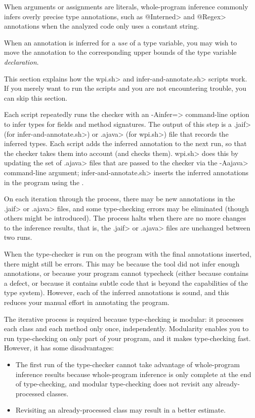 When arguments or assignments are literals, whole-program inference
commonly infers overly precise type annotations, such as \<@Interned> and
\<@Regex> annotations when the analyzed code only uses a constant string.

When an annotation is inferred for a \emph{use} of a type variable,
you may wish to move the annotation
to the corresponding upper bounds of the type variable \emph{declaration}.



This section explains how the \<wpi.sh> and \<infer-and-annotate.sh> scripts work.  If you
merely want to run the scripts and you are not encountering trouble, you can
skip this section.

Each script repeatedly runs the checker with an \<-Ainfer=> command-line option to infer
types for fields and method signatures.  The output of this step
is a \<.jaif> (for \<infer-and-annotate.sh>) or \<.ajava> (for \<wpi.sh>) file that records the inferred types.
Each script adds the inferred annotation to the next run, so that the checker takes them into
account (and checks them). \<wpi.sh> does this by updating the set of \<.ajava> files that are passed
to the checker via the \<-Aajava> command-line argument;
\<infer-and-annotate.sh> inserts the inferred annotations in the program using the
.

On each
iteration through the process, there may be new annotations in the \<.jaif> or \<.ajava>
files, and some type-checking errors may be eliminated (though others might
be introduced).
The process halts when there are no more changes to the inference results,
that is, the \<.jaif> or \<.ajava> files are unchanged between two runs.

When the type-checker is run on the program with the final annotations
inserted, there might still be errors.  This may be because the tool did
not infer enough annotations, or because your program cannot typecheck
(either because contains a defect, or because it contains subtle code that
is beyond the capabilities of the type system).
However, each of the inferred annotations is sound, and this reduces your
manual effort in annotating the program.

The iterative process is required because type-checking is modular:  it
processes each class and each method only once, independently.  Modularity
enables you to run type-checking on only part of your program, and it makes
type-checking fast.  However, it has some disadvantages:
\begin{itemize}
\item
  The first run of the type-checker cannot take advantage of whole-program
  inference results because whole-program inference is only complete at the
  end of type-checking, and modular type-checking does not revisit any
  already-processed classes.
\item
  Revisiting an
  already-processed class may result in a better estimate.
\end{itemize}


